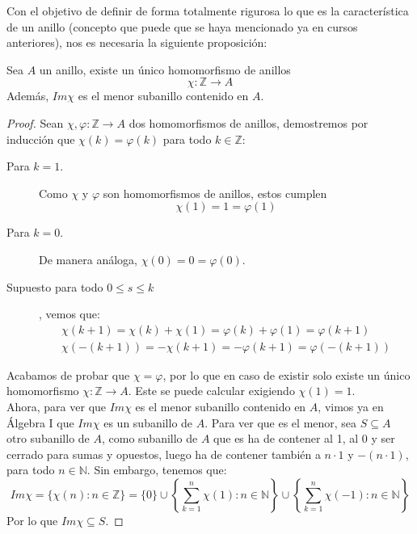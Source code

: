 \noindent
Con el objetivo de definir de forma totalmente rigurosa lo que es la característica de un anillo (concepto que puede que se haya mencionado ya en cursos anteriores), nos es necesaria la siguiente proposición:
\begin{prop}
    Sea $A$ un anillo, existe un único homomorfismo de anillos
    \begin{equation*}
        \chi:\mathbb{Z}\to A
    \end{equation*}
    Además, $Im\chi$ es el menor subanillo contenido en $A$.
    \begin{proof}
        Sean $\chi,\varphi:\mathbb{Z}\to A$ dos homomorfismos de anillos, demostremos por inducción que $\chi(k) = \varphi(k)$ para todo $k\in \mathbb{Z}$:
        \begin{description}
            \item [Para $k=1$.] Como $\chi$ y $\varphi$ son homomorfismos de anillos, estos cumplen 
                \begin{equation*}
                    \chi(1) = 1 = \varphi(1)
                \end{equation*}
            \item [Para $k=0$.] De manera análoga, $\chi(0) = 0 = \varphi(0)$.
            \item [Supuesto para todo $0\leq s\leq k$], vemos que:
                \begin{gather*}
                    \chi(k+1) = \chi(k) + \chi(1) = \varphi(k) + \varphi(1) = \varphi(k+1) \\
                    \chi(-(k+1)) = -\chi(k+1) = -\varphi(k+1) = \varphi(-(k+1))
                \end{gather*}
        \end{description}
        Acabamos de probar que $\chi = \varphi$, por lo que en caso de existir solo existe un único homomorfismo $\chi:\mathbb{Z}\to A$. Este se puede calcular exigiendo $\chi(1)= 1$.\\

        \noindent
        Ahora, para ver que $Im\chi$ es el menor subanillo contenido en $A$, vimos ya en Álgebra I que $Im\chi$ es un subanillo de $A$. Para ver que es el menor, sea $S\subseteq A$ otro subanillo de $A$, como subanillo de $A$ que es ha de contener al 1, al 0 y ser cerrado para sumas y opuestos, luego ha de contener también a $n\cdot 1$ y $-(n\cdot 1)$, para todo $n\in \mathbb{N}$. Sin embargo, tenemos que:
        \begin{equation*}
            Im\chi = \{\chi(n) : n\in \mathbb{Z}\} = \{0\}\cup \left\{\sum_{k=1}^{n}\chi(1) : n\in \mathbb{N}\right\} \cup \left\{\sum_{k=1}^{n}\chi(-1) : n\in \mathbb{N}\right\}
        \end{equation*}
         Por lo que $Im\chi \subseteq S$.
    \end{proof}
\end{prop}

